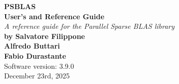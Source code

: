\documentclass[10pt,a4paper,twoside]{article}
\begin{document}
\lstset{language=Fortran}

{\LARGE\bfseries PSBLAS\\[.8ex] User's and Reference
  Guide}\\[\baselineskip]
\emph{\large A reference guide for the Parallel Sparse BLAS library}\\[3ex]
{\bfseries by Salvatore Filippone\\
Alfredo Buttari \\
Fabio Durastante } \\
Software version: 3.9.0\\
December 23rd, 2025
\cleardoublepage
\begingroup
  \renewcommand*{\thepage}{toc}
  \setcounter{page}{1}    %
  \tableofcontents
\endgroup  

\cleardoublepage

\setcounter{page}{1}    %













\cleardoublepage


\end{document}
